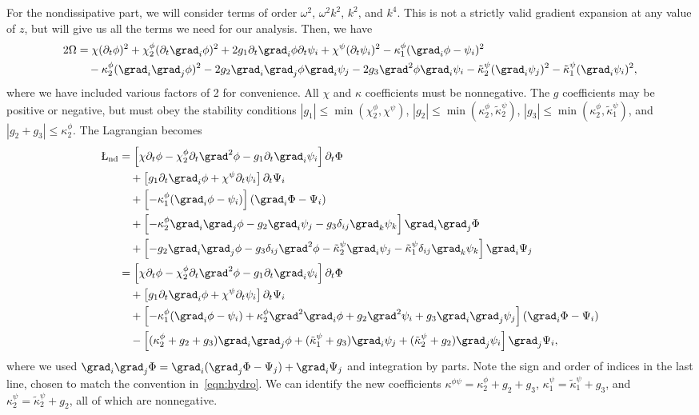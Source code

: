 For the nondissipative part, we will consider terms of order $\omega^2$, $\omega^2k^2$, $k^2$, and $k^4$. This is not a strictly valid gradient expansion at any value of $z$, but will give us all the terms we need for our analysis. Then, we have
\begin{align}
2\Omega &= \chi (\partial_t \phi)^2 + \chi_2^\phi (\partial_t\grad_i\phi)^2 + 2g_1 \partial_t\grad_i\phi \partial_t \psi_i +\chi^\psi (\partial_t\psi_i)^2 - \kappa^\phi_1(\grad_i\phi-\psi_i)^2 \nonumber\\
&\quad - \kappa^\phi_2(\grad_i\grad_j\phi)^2 - 2g_2 \grad_i\grad_j \phi \grad_i\psi_j - 2g_3 \grad^2\phi \grad_i\psi_i - \tilde{\kappa}_2^\psi( \grad_i\psi_j)^2 - \tilde{\kappa}_1^\psi(\grad_i\psi_i)^2,
\end{align}
where we have included various factors of 2 for convenience. All $\chi$ and $\kappa$ coefficients must be nonnegative. The $g$ coefficients may be positive or negative, but must obey the stability conditions $|g_1| \le \min(\chi_2^\phi,\chi^\psi)$, $|g_2| \le \min(\kappa^\phi_2,\tilde{\kappa}_2^\psi)$, $|g_3| \le \min(\kappa^\phi_2,\tilde{\kappa}_1^\psi)$, and $|g_2+g_3| \le \kappa^\phi_2$. The Lagrangian becomes
\begin{align}
\L_\text{nd} &= \left[\chi \partial_t\phi - \chi_2^\phi\partial_t\grad^2\phi - g_1\partial_t\grad_i\psi_i \right] \partial_t\Phi \nonumber\\
&\quad + \left[ g_1\partial_t\grad_i\phi + \chi^\psi\partial_t\psi_i \right] \partial_t \Psi_i \nonumber\\
&\quad + \left[ -\kappa^\phi_1(\grad_i\phi-\psi_i) \right] (\grad_i\Phi - \Psi_i)\nonumber\\
&\quad + \left[ -\kappa^\phi_2\grad_i\grad_j\phi - g_2\grad_i\psi_j  - g_3\delta_{ij}\grad_k\psi_k\right] \grad_i\grad_j\Phi \nonumber\\
&\quad + \left[ - g_2\grad_i\grad_j\phi - g_3 \delta_{ij}\grad^2\phi - \tilde{\kappa}_2^\psi \grad_i\psi_j - \tilde{\kappa}_1^\psi\delta_{ij} \grad_k\psi_k \right] \grad_i\Psi_j \nonumber\\
&= \left[\chi \partial_t\phi - \chi_2^\phi\partial_t\grad^2\phi - g_1\partial_t\grad_i\psi_i \right] \partial_t\Phi \nonumber\\
&\quad + \left[ g_1\partial_t\grad_i\phi + \chi^\psi\partial_t\psi_i \right] \partial_t \Psi_i \nonumber\\
&\quad + \left[ -\kappa^\phi_1(\grad_i\phi-\psi_i) + \kappa^\phi_2 \grad^2\grad_i\phi + g_2\grad^2\psi_i + g_3\grad_i\grad_j\psi_j \right] (\grad_i\Phi - \Psi_i)\nonumber\\
&\quad - \left[ (\kappa^\phi_2+g_2+g_3) \grad_i\grad_j\phi + (\tilde{\kappa}_1^\psi+g_3) \grad_i\psi_j + (\tilde{\kappa}_2^\psi+g_2)\grad_j\psi_i \right] \grad_j\Psi_i,
\end{align}
where we used $\grad_i\grad_j\Phi = \grad_i(\grad_j\Phi - \Psi_j)+\grad_i\Psi_j$ and integration by parts. Note the sign and order of indices in the last line, chosen to match the convention in~\eqref{eqn:hydro}. We can identify the new coefficients   $\kappa^{\phi\psi} = \kappa^\phi_2+g_2+g_3$, $\kappa_1^\psi = \tilde{\kappa}_1^\psi+g_3$, and $\kappa^\psi_2 = \tilde{\kappa}_2^\psi+g_2$, all of which are nonnegative.

